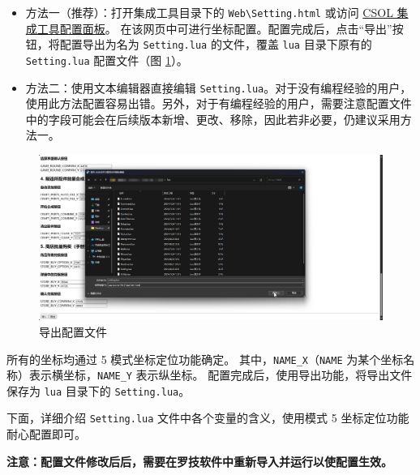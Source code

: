 \begin{itemize}
\item 方法一（推荐）：打开集成工具目录下的 \lstinline{Web\Setting.html} 或访问 \href{https://macrohard.fun/CSOL-Utilities/Setting.html}{CSOL 集成工具配置面板}。 在该网页中可进行坐标配置。配置完成后，点击“导出”按钮，将配置导出为名为 \lstinline{Setting.lua} 的文件，覆盖 \lstinline{lua} 目录下原有的 \lstinline{Setting.lua} 配置文件（图 \ref{ch2fig-export-setting}）。
\item 方法二：使用文本编辑器直接编辑 \lstinline{Setting.lua}。对于没有编程经验的用户，使用此方法配置容易出错。另外，对于有编程经验的用户，需要注意配置文件中的字段可能会在后续版本新增、更改、移除，因此若非必要，仍建议采用方法一。
\end{itemize}

\begin{figure}[H]
    \Centering
    \includegraphics[width=\textwidth]{docs/assets/export_setting}
    \caption{导出配置文件}
    \label{ch2fig-export-setting}
\end{figure}

所有的坐标均通过 5 模式坐标定位功能确定。
其中，\lstinline{NAME_X}（\lstinline{NAME} 为某个坐标名称）表示横坐标，\lstinline{NAME_Y} 表示纵坐标。
配置完成后，使用导出功能，将导出文件保存为 \lstinline{lua} 目录下的 \lstinline{Setting.lua}。

下面，详细介绍 \lstinline{Setting.lua} 文件中各个变量的含义，使用模式 5 坐标定位功能耐心配置即可。

\textbf{\color{red}注意：配置文件修改后后，需要在罗技软件中重新导入并运行以使配置生效。}

